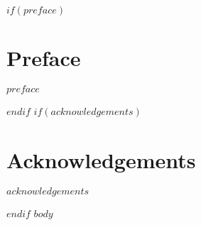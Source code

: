 \documentclass[10pt,twoside]{book}                  %
\begin{document}
\prefrontmatter
\frontmatter
{}                               %
$if(preface)$
\chapter{Preface}
$preface$                                  %
\markboth{}{}                                       %
$endif$
$if(acknowledgements)$
\chapter{Acknowledgements}
$acknowledgements$                                  %
\markboth{}{}                                       %
$endif$
$body$
\end{document}
